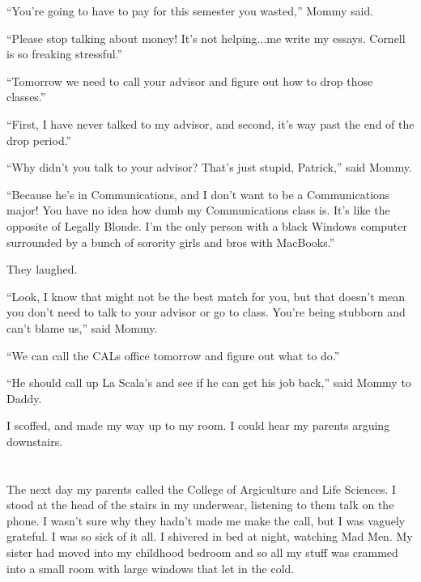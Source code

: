 ``You're going to have to pay for this semester you wasted,'' Mommy said.

``Please stop talking about money!  It's not helping...me write my essays.
Cornell is so freaking stressful.''

``Tomorrow we need to call your advisor and figure out how to drop those
classes.''

``First, I have never talked to my advisor, and second, it's way past the end of
the drop period.''

``Why didn't you talk to your advisor?  That's just stupid, Patrick,'' said Mommy.

``Because he's in Communications, and I don't want to be a Communications major!
You have no idea how dumb my Communications class is.  It's like the opposite of
Legally Blonde.  I'm the only person with a black Windows computer surrounded by
a bunch of sorority girls and bros with MacBooks.''

They laughed.

``Look, I know that might not be the best match for you, but that doesn't mean
you don't need to talk to your advisor or go to class.  You're being stubborn
and can't blame us,'' said Mommy.

``We can call the CALs office tomorrow and figure out what to do.''

``He should call up La Scala's and see if he can get his job back,'' said Mommy to
Daddy.

I scoffed, and made my way up to my room.  I could hear my parents arguing
downstairs.

\section{}

The next day my parents called the College of Argiculture and Life Sciences.  I
stood at the head of the stairs in my underwear, listening to them talk on the
phone.  I wasn't sure why they hadn't made me make the call, but I was vaguely
grateful.  I was so sick of it all.  I shivered in bed at night, watching Mad
Men.  My sister had moved into my childhood bedroom and so all my stuff was
crammed into a small room with large windows that let in the cold.  

